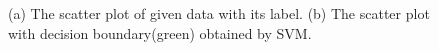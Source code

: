 \documentclass[10pt]{article}
\begin{document}
\begin{figure}[!h]
    \begin{center}
    \end{center}
    \caption{(a) The scatter plot of given data with its label. (b) The scatter plot with decision boundary(green) obtained by SVM.}
    \label{fig3}
\end{figure}
\end{document}
